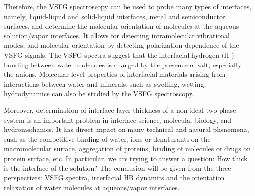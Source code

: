 Therefore, the VSFG spectroscopy can be used to probe many types of interfaces, namely, liquid-liquid and 
solid-liquid interfaces\cite{Guyot-Sionnest1987,RS91,Du93,QD94,Richmond02,Gopalakrishnan2006,ShenYR2006,Morita2008}, metal and semiconductor surfaces\cite{Harris87,Superfine88},
and determine the molecular orientation of molecules at the aqueous solution/vapor interfaces.
It allows for detecting intramolecular vibrational modes, and molecular orientation by detecting polarization dependence of the VSFG signals\cite{Vidal05}.  
The VSFG spectra suggest that the interfacial hydrogen (H-) bonding between water molecules is changed by the presence of salt, 
especially the anions\cite{EAR04}.
Molecular-level properties of interfacial materials arising from interactions between water and minerals, 
such as swelling, wetting, hydrodynamics can also be studied by the VSFG spectroscopy\cite{Rotenberg14}.

Moreover, determination of interface layer thickness of a non-ideal two-phase system is an important problem in interface science, molecular biology, 
and hydromechanics.\cite{LiZhihong2001,Goharzadeh2005,Bano2006} It has direct impact on many technical and natural phenomena, 
sush as the competitive binding of water, ions or denaturants on the macromolecular surface\cite{Arakawa1985,Timasheff2002}, 
aggregation of proteins\cite{Webb2001}, binding of molecules or drugs on protein surface\cite{Hritz2004}, etc. 
In particular, we are trying to answer a question: How thick is the interface of the solution? 
The conclusion will be given from the three perspectives: VSFG spectra, interfacial HB dynamics 
and the orientation relaxation of water molecules at aqueous/vapor interfaces.



